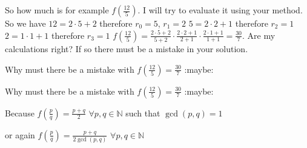 \begin{solution}
	\begin{tcolorbox}So how much is for example $ f\left(\frac {12}{5}\right)$.
I will try to evaluate it using your method.
So we have $ 12 = 2\cdot5 + 2$ therefore $ r_{0} = 5$, $ r_{1} = 2$
$ 5 = 2\cdot2 + 1$ therefore $ r_{2} = 1$
$ 2 = 1\cdot1 + 1$ therefore $ r_{3} = 1$
$ f\left(\frac {12}{5}\right) = \frac {2\cdot5 + 2}{5 + 2}\cdot\frac {2\cdot2 + 1}{2 + 1}\cdot\frac {2\cdot1 + 1}{1 + 1} = \frac {30}{7}$. Are my calculations right? If so there must be a mistake in your solution.\end{tcolorbox}

Why must there be a mistake with $ f \left( \frac{12}{5} \right) = \frac{30}{7}$ :maybe:
\end{solution}



\begin{solution}
	\begin{tcolorbox} Why must there be a mistake with $ f \left( \frac {12}{5} \right) = \frac {30}{7}$ :maybe:\end{tcolorbox}

Because $ f(\frac pq) = \frac {p + q}2$ $ \forall p,q\in\mathbb N$ such that $ \gcd(p,q) = 1$

or again $ f(\frac pq) = \frac {p + q}{2\gcd(p,q)}$ $ \forall p,q\in\mathbb N$
\end{solution}



